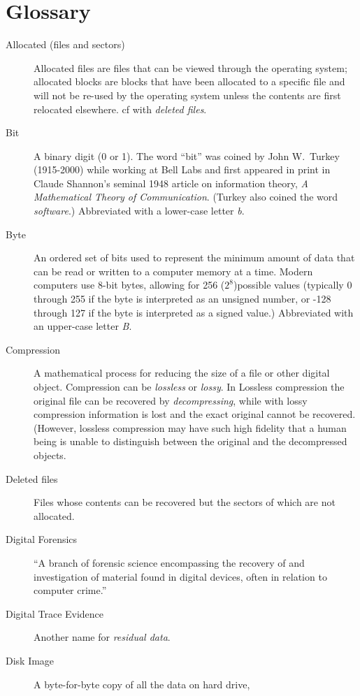 \chapter{Glossary}
\begin{description}
\item[Allocated (files and sectors)] Allocated files are files that can be viewed through
  the operating system; allocated blocks are blocks that have been
  allocated to a specific file and will not be re-used by the
  operating system unless the contents are first relocated
  elsewhere. cf with \emph{deleted files}.
\item[Bit] A binary digit (0 or 1). The word ``bit'' was coined by
  John W.\ Turkey (1915-2000) while working at Bell Labs and first appeared in
  print in Claude Shannon's seminal 1948 article on information
  theory, \emph{A Mathematical Theory of Communication}. (Turkey also
  coined the word \emph{software}.) Abbreviated with a lower-case
  letter \emph{b}.
\item[Byte] An ordered set of bits used to represent the minimum
  amount of data that can be read or written to a computer memory at a
  time. Modern computers use 8-bit bytes, allowing for 256
  ($2^8$)possible values (typically 0 through 255 if the byte is
  interpreted as an unsigned number, or -128 through 127 if the byte
  is interpreted as a signed value.) Abbreviated with an upper-case
  letter \emph{B}.
\item[Compression] A mathematical process for reducing the size of a
  file or other digital object. Compression can be \emph{lossless} or
  \emph{lossy}. In Lossless compression the original file can be recovered by
  \emph{decompressing}, while with lossy compression information is
  lost and the exact original cannot be recovered. (However, lossless
  compression may have such high fidelity that a human being is unable
  to distinguish between the original and the decompressed objects.
\item[Deleted files] Files whose contents can be recovered but the
  sectors of which are not allocated.
\item[Digital Forensics] ``A branch of forensic science encompassing the
  recovery of and investigation of material
  found in digital devices, often in relation to computer crime.''\cite{reith:examination}
\item[Digital Trace Evidence] Another name for \emph{residual data}.
\item[Disk Image] A byte-for-byte copy of all the data on hard drive,

\end{description}
